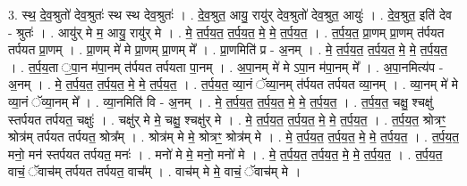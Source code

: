 \documentclass[17pt]{extarticle}
\begin{document}
3. स्थ॒ दे॒व॒श्रुतो॑ देव॒श्रुतः॑ स्थ स्थ देव॒श्रुतः॑ । . दे॒व॒श्रुत॒ आयु॒ रायु॑र् देव॒श्रुतो॑ देव॒श्रुत॒ आयुः॑ । . दे॒व॒श्रुत॒ इति॑ देव - श्रुतः॑ । . आयु॑र् मे म॒ आयु॒ रायु॑र् मे । . मे॒ त॒र्प॒य॒त॒ त॒र्प॒य॒त॒ मे॒ मे॒ त॒र्प॒य॒त॒ । . त॒र्प॒य॒त॒ प्रा॒णम् प्रा॒णम् त॑र्पयत तर्पयत प्रा॒णम् । . प्रा॒णम् मे॑ मे प्रा॒णम् प्रा॒णम् मे᳚ । . प्रा॒णमिति॑ प्र - अ॒नम् । . मे॒ त॒र्प॒य॒त॒ त॒र्प॒य॒त॒ मे॒ मे॒ त॒र्प॒य॒त॒ । . त॒र्प॒य॒ता ॒पा॒न म॑पा॒नम् त॑र्पयत तर्पयता पा॒नम् । . अ॒पा॒नम् मे॑ मे ऽपा॒न म॑पा॒नम् मे᳚ । . अ॒पा॒नमित्य॑प - अ॒नम् । . मे॒ त॒र्प॒य॒त॒ त॒र्प॒य॒त॒ मे॒ मे॒ त॒र्प॒य॒त॒ । . त॒र्प॒य॒त॒ व्या॒नं ॅव्या॒नम् त॑र्पयत तर्पयत व्या॒नम् । . व्या॒नम् मे॑ मे व्या॒नं ॅव्या॒नम् मे᳚ । . व्या॒नमिति॑ वि - अ॒नम् । . मे॒ त॒र्प॒य॒त॒ त॒र्प॒य॒त॒ मे॒ मे॒ त॒र्प॒य॒त॒ । . त॒र्प॒य॒त॒ चक्षु॒ श्चक्षु॑ स्तर्पयत तर्पयत॒ चक्षुः॑ । . चक्षु॑र् मे मे॒ चक्षु॒ श्चक्षु॑र् मे । . मे॒ त॒र्प॒य॒त॒ त॒र्प॒य॒त॒ मे॒ मे॒ त॒र्प॒य॒त॒ । . त॒र्प॒य॒त॒ श्रोत्रꣳ॒॒ श्रोत्र॑म् तर्पयत तर्पयत॒ श्रोत्र᳚म् । . श्रोत्र॑म् मे मे॒ श्रोत्रꣳ॒॒ श्रोत्र॑म् मे । . मे॒ त॒र्प॒य॒त॒ त॒र्प॒य॒त॒ मे॒ मे॒ त॒र्प॒य॒त॒ । . त॒र्प॒य॒त॒ मनो॒ मन॑ स्तर्पयत तर्पयत॒ मनः॑ । . मनो॑ मे मे॒ मनो॒ मनो॑ मे । . मे॒ त॒र्प॒य॒त॒ त॒र्प॒य॒त॒ मे॒ मे॒ त॒र्प॒य॒त॒ । . त॒र्प॒य॒त॒ वाचं॒ ॅवाच॑म् तर्पयत तर्पयत॒ वाच᳚म् । . वाच॑म् मे मे॒ वाचं॒ ॅवाच॑म् मे । \newline
\end{document}
